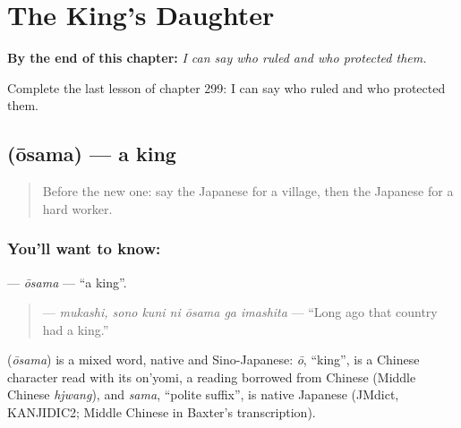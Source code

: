 
\chapter{The King's Daughter}
\label{ch:ja-the-king-s-daughter}

\begin{chapteropening}
\textbf{By the end of this chapter:} \emph{I can say who ruled and who protected them.}

Complete the last lesson of chapter 299: I can say who ruled and who protected them.
\end{chapteropening}

\section[\texorpdfstring{\ja{おうさま} (ōsama)}{おうさま (ōsama)}]{ (ōsama) — a king}

\label{lesson:JA-C299-ousama}



\begin{quote}
Before the new one: say the Japanese for a village, then the Japanese for a hard worker.
\end{quote}

\subsection*{You'll want to know: }
\textbf{} — \emph{ōsama} — \textquotedblleft{}a king\textquotedblright{}.

\begin{quote}
\textbf{   } — \emph{mukashi, sono kuni ni ōsama ga imashita} — \textquotedblleft{}Long ago that country had a king.\textquotedblright{}
\end{quote}

\begin{cousinweb}
\textbf{} (\emph{ōsama}) is a mixed word, native and Sino-Japanese: \emph{ō}, \textquotedblleft{}king\textquotedblright{}, is a Chinese character read with its on'yomi, a reading borrowed from Chinese (Middle Chinese \emph{hjwang}), and \emph{sama}, \textquotedblleft{}polite suffix\textquotedblright{}, is native Japanese (JMdict, KANJIDIC2; Middle Chinese in Baxter's transcription).
\end{cousinweb}

